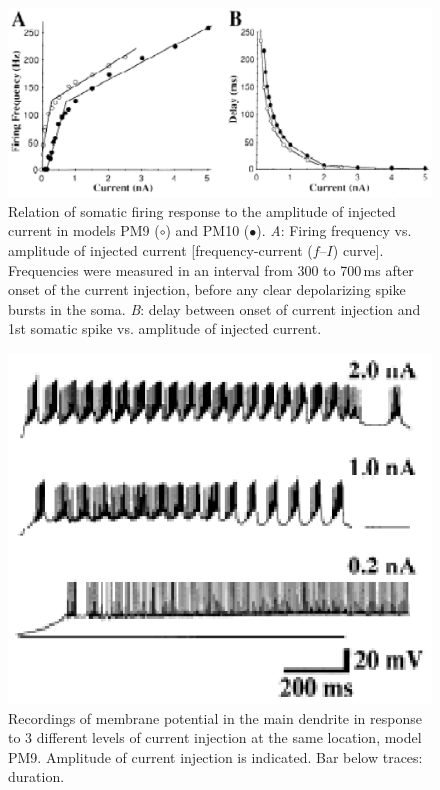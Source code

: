 \documentclass[12pt]{article}
\begin{document}
\clearpage

\begin{figure}[h]
\centering
   \includegraphics[scale=0.75]{figures/Fig.1.6.eps}
   \caption{Relation of somatic firing response to the amplitude of injected current in models PM9 ($\circ$) and PM10 ($\bullet$). {\it A}: Firing frequency vs. amplitude of injected current [frequency-current ($f$--$I$) curve]. Frequencies were measured in an interval from 300 to 700\,ms after onset of the current injection, before any clear depolarizing spike bursts in the soma. {\it B}: delay between onset of current injection and 1st somatic spike vs. amplitude of injected current.}
   \label{fig:DS1.6}
\end{figure}

\clearpage

\begin{figure}[h]
\centering
   \includegraphics[scale=1]{figures/Fig.1.7.eps}
   \caption{Recordings of membrane potential in the main dendrite in response
to 3 different levels of current injection at the same location, model
PM9. Amplitude of current injection is indicated. Bar below traces: duration.}
   \label{fig:DS1.7}
\end{figure}
\end{document}
